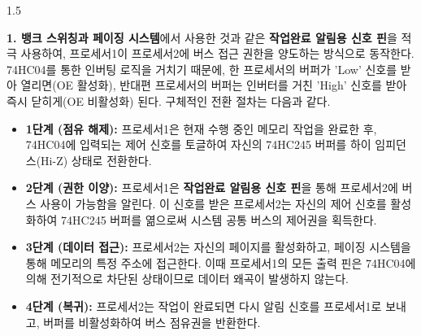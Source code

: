 \documentclass[a4paper, 12pt]{article}
\begin{document}
\begin{spacing}{1.5}
\begin{enumerate}
\textbf{1. 뱅크 스위칭과 페이징 시스템}에서 사용한 것과 같은 \textbf{작업완료 알림용 신호 핀}을 적극 사용하여, 프로세서1이 프로세서2에 버스 접근 권한을 양도하는 방식으로 동작한다. 74HC04를 통한 인버팅 로직을 거치기 때문에, 한 프로세서의 버퍼가 'Low' 신호를 받아 열리면(OE 활성화), 반대편 프로세서의 버퍼는 인버터를 거친 'High' 신호를 받아 즉시 닫히게(OE 비활성화) 된다. 구체적인 전환 절차는 다음과 같다.
\begin{itemize}
\item \textbf{1단계 (점유 해제):} 프로세서1은 현재 수행 중인 메모리 작업을 완료한 후, 74HC04에 입력되는 제어 신호를 토글하여 자신의 74HC245 버퍼를 하이 임피던스(Hi-Z) 상태로 전환한다.
\item \textbf{2단계 (권한 이양):} 프로세서1은 \textbf{작업완료 알림용 신호 핀}을 통해 프로세서2에 버스 사용이 가능함을 알린다. 이 신호를 받은 프로세서2는 자신의 제어 신호를 활성화하여 74HC245 버퍼를 엶으로써 시스템 공통 버스의 제어권을 획득한다.
\item \textbf{3단계 (데이터 접근):} 프로세서2는 자신의 페이지를 활성화하고, 페이징 시스템을 통해 메모리의 특정 주소에 접근한다. 이때 프로세서1의 모든 출력 핀은 74HC04에 의해 전기적으로 차단된 상태이므로 데이터 왜곡이 발생하지 않는다.
\item \textbf{4단계 (복귀):} 프로세서2는 작업이 완료되면 다시 알림 신호를 프로세서1로 보내고, 버퍼를 비활성화하여 버스 점유권을 반환한다.
\end{itemize}

\end{enumerate}
\end{spacing}
\end{document}
